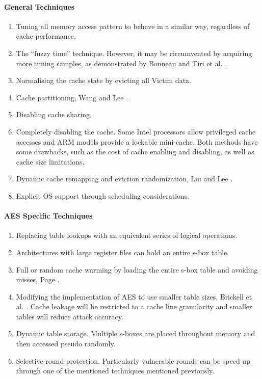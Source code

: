 		\paragraph{General Techniques}
			\begin{enumerate}
			\item Tuning all memory access pattern to behave in a similar way, regardless of cache performance. 
			\item The ``fuzzy time'' technique. However, it may be circumvented by acquiring more timing samples, as demonstrated by Bonneau \cite{Bonneau06_0} and Tiri et al. \cite{Tiri07}.
			\item Normalising the cache state by evicting all Victim data.
			\item Cache partitioning, Wang and Lee \cite{Wang07}.
			\item Disabling cache sharing.
			\item Completely disabling the cache. Some Intel processors allow privileged cache accesses and ARM models provide a lockable mini-cache. Both methods have some drawbacks, such as the cost of cache enabling and disabling, as well as cache size limitations.
			\item Dynamic cache remapping and eviction randomization, Liu and Lee \cite{Liu13}.
			\item Explicit OS support through scheduling considerations.
			\end{enumerate}
		
		\paragraph{AES Specific Techniques}
			\begin{enumerate}
			\item Replacing table lookups with an equivalent series of logical operations.
			\item Architectures with large register files can hold an entire s-box table.
			\item Full or random cache warming by loading the entire s-box table and avoiding misses, Page \cite{Page02,Page05}.
			\item Modifying the implementation of AES to use smaller table sizes, Brickell et al. \cite{Brickell06}. Cache leakage will be restricted to a cache line granularity and smaller tables will reduce attack accuracy.
			\item Dynamic table storage. Multiple s-boxes are placed throughout memory and then accessed pseudo randomly.
			\item Selective round protection. Particularly vulnerable rounds can be speed up through one of the mentioned techniques mentioned previously.
			\end{enumerate}

